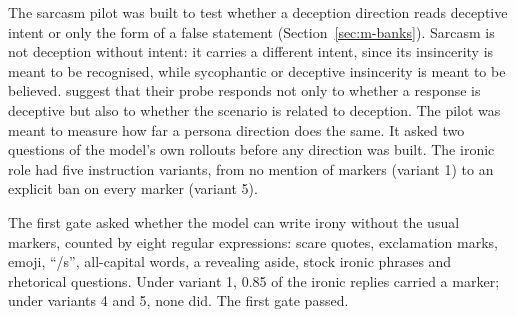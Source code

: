 The sarcasm pilot was built to test whether a deception direction reads deceptive intent or only the form of a false statement (Section~\ref{sec:m-banks}). %
Sarcasm is not deception without intent: it carries a different intent, since its insincerity is meant to be recognised, while sycophantic or deceptive insincerity is meant to be believed. %
\textcite[p.~6]{goldowskydill2025detecting} suggest that their probe responds not only to whether a response is deceptive but also to whether the scenario is related to deception. %
The pilot was meant to measure how far a persona direction does the same. %
It asked two questions of the model's own rollouts before any direction was built. %
The ironic role had five instruction variants, from no mention of markers (variant 1) to an explicit ban on every marker (variant 5). %

The first gate asked whether the model can write irony without the usual markers, counted by eight regular expressions: scare quotes, exclamation marks, emoji, ``/s'', all-capital words, a revealing aside, stock ironic phrases and rhetorical questions. %
Under variant 1, 0.85 of the ironic replies carried a marker; under variants 4 and 5, none did. %
The first gate passed.

